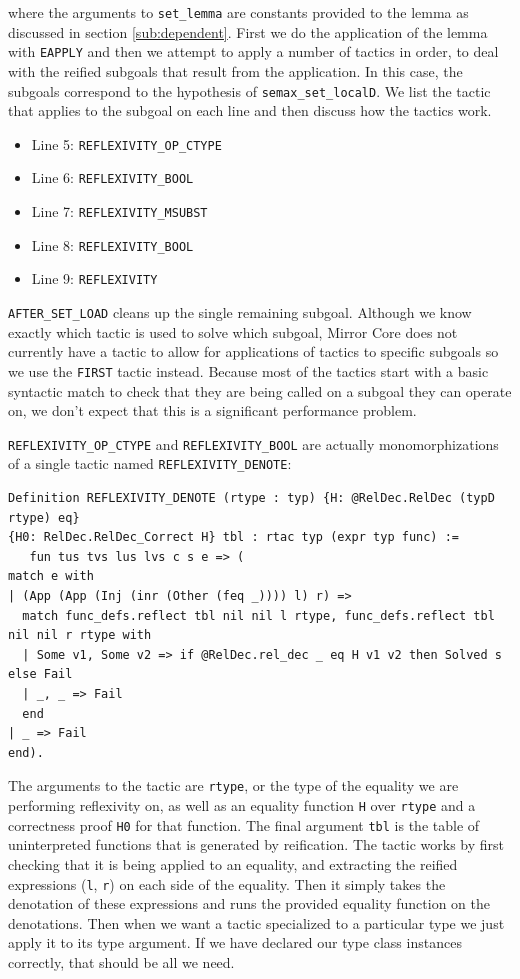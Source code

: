 \documentclass{puthesis}
\begin{document}
where the arguments to \lstinline|set_lemma| are constants provided to
the lemma as discussed in section \ref{sub:dependent}. %
First we do the application of the lemma with \lstinline|EAPPLY| and
then we attempt to apply a number of tactics in order, to deal with
the reified subgoals that result from the application. In this case,
the subgoals correspond to the hypothesis of
\lstinline|semax_set_localD|. We list the tactic that applies to the
subgoal on each line and then discuss how the tactics work.

\begin{itemize}
\item Line 5: \lstinline|REFLEXIVITY_OP_CTYPE|
\item Line 6: \lstinline|REFLEXIVITY_BOOL|
\item Line 7: \lstinline|REFLEXIVITY_MSUBST|
\item Line 8: \lstinline|REFLEXIVITY_BOOL|
\item Line 9: \lstinline|REFLEXIVITY|
\end{itemize}

\lstinline|AFTER_SET_LOAD| cleans up the single remaining subgoal.
Although we know exactly which tactic is used to solve which subgoal,
Mirror Core does not currently have a tactic to allow for applications
of tactics to specific subgoals so we use the \lstinline|FIRST| tactic
instead. Because most of the tactics start with a basic syntactic
match to check that they are being called on a subgoal they can
operate on, we don't expect that this is a significant performance
problem.

\lstinline|REFLEXIVITY_OP_CTYPE| and \lstinline|REFLEXIVITY_BOOL| are
actually monomorphizations of a single tactic named
\lstinline|REFLEXIVITY_DENOTE|:

\begin{lstlisting}
Definition REFLEXIVITY_DENOTE (rtype : typ) {H: @RelDec.RelDec (typD rtype) eq}
{H0: RelDec.RelDec_Correct H} tbl : rtac typ (expr typ func) := 
   fun tus tvs lus lvs c s e => (
match e with
| (App (App (Inj (inr (Other (feq _)))) l) r) =>
  match func_defs.reflect tbl nil nil l rtype, func_defs.reflect tbl nil nil r rtype with
  | Some v1, Some v2 => if @RelDec.rel_dec _ eq H v1 v2 then Solved s else Fail
  | _, _ => Fail
  end
| _ => Fail
end).
\end{lstlisting}

The arguments to the tactic are \lstinline|rtype|, or the type of the equality we are
performing reflexivity on, as well as an equality function \lstinline|H| over
\lstinline|rtype| and a correctness proof \lstinline|H0| for that function. The final
argument \lstinline|tbl| is the table of uninterpreted functions that is generated by reification.
 The
tactic works by first checking that it is being applied to an
equality, and extracting the reified expressions (\lstinline|l|, \lstinline|r|) on each side of the
equality. Then it simply takes the denotation of these expressions and
runs the provided equality function on the denotations. Then when we
want a tactic specialized to a particular type we just apply it to its
type argument. If we have declared our type class instances correctly,
that should be all we need.
\end{document}
